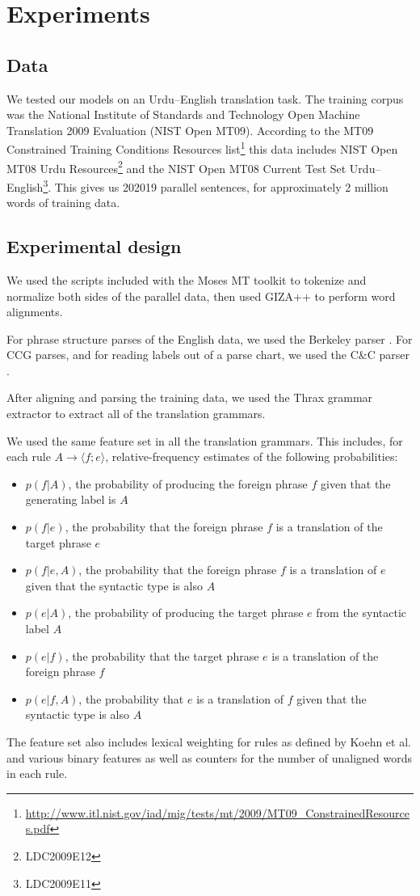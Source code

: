 \documentclass[a4paper]{article}
\begin{document}
\section{Experiments}

\subsection{Data}

We tested our models on an Urdu--English translation task. The training corpus was the National Institute of Standards and Technology Open Machine Translation 2009 Evaluation (NIST Open MT09). According to the MT09 Constrained Training Conditions Resources list\footnote{\url{http://www.itl.nist.gov/iad/mig/tests/mt/2009/MT09_ConstrainedResources.pdf}} this data includes NIST Open MT08 Urdu Resources\footnote{LDC2009E12} and the NIST Open MT08 Current Test Set Urdu--English\footnote{LDC2009E11}. This gives us 202019 parallel sentences, for approximately 2 million words of training data.

\subsection{Experimental design}

We used the scripts included with the Moses MT toolkit \cite{moses} to tokenize and normalize both sides of the parallel data, then used GIZA++ \cite{giza} to perform word alignments.

For phrase structure parses of the English data, we used the Berkeley parser \cite{berkeley}. For CCG parses, and for reading labels out of a parse chart, we used the C\&C parser \cite{candc}.

After aligning and parsing the training data, we used the Thrax grammar extractor \cite{joshua3} to extract all of the translation grammars.

We used the same feature set in all the translation grammars. This includes, for each rule $A \to \langle f ; e \rangle$, relative-frequency estimates of the following probabilities:
\begin{itemize}
\item $p(f|A)$, the probability of producing the foreign phrase $f$ given that the generating label is $A$
\item $p(f|e)$, the probability that the foreign phrase $f$ is a translation of the target phrase $e$
\item $p(f|e,A)$, the probability that the foreign phrase $f$ is a translation of $e$ given that the syntactic type is also $A$
\item $p(e|A)$, the probability of producing the target phrase $e$ from the syntactic label $A$
\item $p(e|f)$, the probability that the target phrase $e$ is a translation of the foreign phrase $f$
\item $p(e|f,A)$, the probability that $e$ is a translation of $f$ given that the syntactic type is also $A$
\end{itemize}
The feature set also includes lexical weighting for rules as defined by Koehn et al.  and various binary features as well as counters for the number of unaligned words in each rule.
\end{document}
